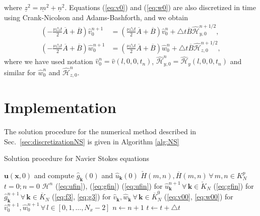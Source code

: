 \documentclass[11pt, oneside]{article}
\newcommand{\N}[1]{\check{#1}}
\newcommand{\D}[1]{\overline{#1}}
\begin{document}
where $\underline{z}^2 = \underline{m}^2 + \underline{n}^2$. Equations 
(\ref{eq:v0}) and (\ref{eq:w0}) are also discretized in time using 
Crank-Nicolson and Adams-Bashforth, and we obtain
\begin{align}
\left(-\frac{\nu \triangle t}{2}\D{A} + \D{B} \right)\hat{v}_0^{n+1} &= 
\left(\frac{\nu \triangle t}{2}\D{A} + \D{B} 
\right)\hat{v}^{n}_0 + \triangle t\D{B}\hat{\mathcal{H}}_{y,0}^{n+1/2} , 
\label{eq:v00} \\
\left(-\frac{\nu \triangle t}{2}\D{A} + \D{B} \right)\hat{w}_0^{n+1} &= 
\left(\frac{\nu \triangle t}{2}\D{A} + \D{B} 
\right)\hat{w}^{n}_0 + \triangle t\D{B}\hat{\mathcal{H}}_{z,0}^{n+1/2}, 
\label{eq:w00}
\end{align}
where we have used notation $\hat{v}^{n}_0 = \hat{v}(l, 0, 0, t_n)$, 
$\hat{\mathcal{H}}^{n}_{y,0} = \hat{\mathcal{H}}_y(l, 0, 0, t_n)$ and similar 
for $\hat{w}^n_0$ and $\hat{\mathcal{H}}^n_{z,0}$.

\section{Implementation}

The solution procedure for the numerical method described in 
Sec.~\ref{sec:discretizationNS} is given in Algorithm \ref{alg:NS}

\begin{algorithm}
	\caption{Solution procedure for Navier Stokes equations}
    \label{alg:NS}
    \begin{algorithmic}[1]
    	\State {} $\bm{u}(\bm{x}, 0)$ and compute 
    	$\hat{g}_{\bm{k}}(0)$ and $\hat{u}_{\bm{k}}(0)$
		\State {} $\N{H}(m,n), \D{H}(m,n) 
		\,\forall \, m, n \in K_N^p$
		\State $t=0; n=0$
	    	\State {} $\bm{\mathcal{H}}^n$
	    	\State {}(\ref{eq:ufin}), 
	    	(\ref{eq:gfin})
		    \State {}(\ref{eq:ufin}) for 
		    $\hat{u}^{n+1}_{\bm{k}} \, \forall \,\bm{k} \in \N{K}_N$
		    \State {}(\ref{eq:gfin}) for 
		    $\hat{g}^{n+1}_{\bm{k}} \, \forall\, \bm{k} \in \D{K}_N$
		    \State {}(\ref{eq:f3}, \ref{eq:g3}) for  
		    $\hat{v}_{\bm{k}}, \hat{w}_{\bm{k}}\, \forall\, \bm{k} 
		    \in \D{K}_N^0$
		    \State {}(\ref{eq:v00}, \ref{eq:w00}) for 
		    $\hat{v}_0^{n+1}, \hat{w}_0^{n+1}\, 
		    \forall \, l \in [0, 1, \ldots, N_x-2] $
		    \State $n \gets n + 1$
		    \State $t \gets t+\triangle t$
		    \State {}
	    \EndWhile 
	    	
    \end{algorithmic}
\end{algorithm}
\end{document}
